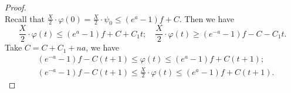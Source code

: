 \documentclass[10pt,a4paper]{amsart}
\begin{document}
\begin{proof}
\begin{equation*}
    \end{equation*}
    Recall that $\frac{X}{2}\cdot\varphi(0)=\frac{X}{2}\cdot\psi_0\le (e^a-1)f+C$. Then we have
    \begin{equation*}
        \frac{X}{2}\cdot\varphi(t)\le (e^a-1)f+C+C_1t;\quad \frac{X}{2}\cdot\varphi(t)\ge (e^{-a}-1)f-C-C_1t.
    \end{equation*}
    Take $C=C+C_1+na$, we have
    \begin{equation*}
        \begin{split}
           & (e^{-a}-1)f-C(t+1)\le \varphi(t)\le (e^a-1)f+C(t+1);\\
           &(e^{-a}-1)f-C(t+1)\le\frac{X}{2}\cdot\varphi(t)\le (e^a-1)f+C(t+1).  
        \end{split}
          \end{equation*}
\end{proof}
\end{document}
